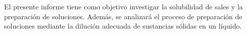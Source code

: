 \documentclass[../main.tex]{subfiles}
\begin{document}
El presente informe tiene como objetivo investigar 
la solubilidad de sales y la preparación de soluciones. 
Además, se analizará el proceso de preparación de soluciones
mediante la dilución adecuada de sustancias sólidas en un líquido.
\end{document}
